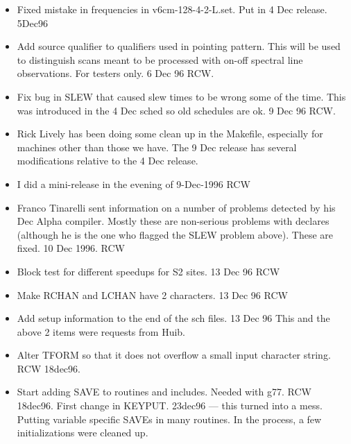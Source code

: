 \documentclass{report}
\begin{document}
\begin{itemize}

\item Fixed mistake in frequencies in v6cm-128-4-2-L.set.  Put in
      4 Dec release.  5Dec96

\item Add source qualifier to qualifiers used in pointing pattern.
      This will be used to distinguish scans meant to be processed
      with on-off spectral line observations.  For testers only.
      6 Dec 96 RCW.

\item Fix bug in SLEW that caused slew times to be wrong some
      of the time.  This was introduced in the 4 Dec sched so
      old schedules are ok.  9 Dec 96 RCW.

\item Rick Lively has been doing some clean up in the Makefile,
      especially for machines other than those we have.  The
      9 Dec release has several modifications relative to the
      4 Dec release.

\item I did a mini-release in the evening of 9-Dec-1996  RCW

\item Franco Tinarelli sent information on a number of problems
      detected by his Dec Alpha compiler.  Mostly these are non-serious
      problems with declares (although he is the one who flagged
      the SLEW problem above).  These are fixed. 10 Dec 1996. RCW

\item Block test for different speedups for S2 sites. 13 Dec 96 RCW

\item Make RCHAN and LCHAN have 2 characters.  13 Dec 96  RCW

\item Add setup information to the end of the sch files. 13 Dec 96
      This and the above 2 items were requests from Huib.

\item Alter TFORM so that it does not overflow a small input
      character string.  RCW  18dec96.

\item Start adding SAVE to routines and includes.  Needed with g77.
      RCW  18dec96.  First change in KEYPUT.
      23dec96 --- this turned into a mess.  Putting variable specific
      SAVEs in many routines.  In the process, a few initializations
      were cleaned up.


\end{itemize}
\end{document}

